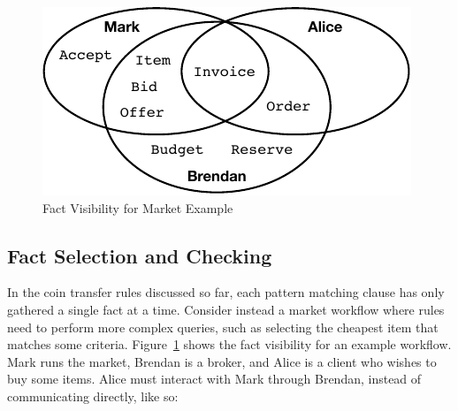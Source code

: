 

\begin{figure}
\begin{center}
\includegraphics{figure/auction-visibility.pdf}
\end{center}
\vspace{-2ex}
\caption{Fact Visibility for Market Example}
\label{f:AuctionVisibility}
\end{figure}


\subsection{Fact Selection and Checking}
\label{s:Query}
\label{s:Selection}
In the coin transfer rules discussed so far, each pattern matching clause has only gathered a single fact at a time. Consider instead a market workflow where rules need to perform more complex queries, such as selecting the cheapest item that matches some criteria. Figure~\ref{f:AuctionVisibility} shows the fact visibility for an example workflow. Mark runs the market, Brendan is a broker, and Alice is a client who wishes to buy some items. Alice must interact with Mark through Brendan, instead of communicating directly, like so:

